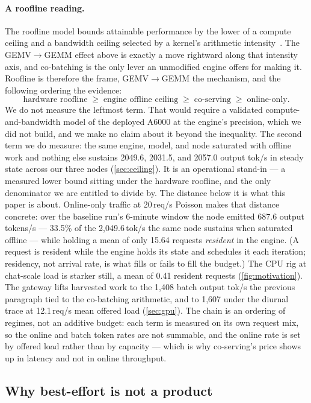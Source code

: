 \documentclass[11pt]{article}
\begin{document}
\paragraph{A roofline reading.} The roofline model bounds attainable performance by the
lower of a compute ceiling and a bandwidth ceiling selected by a kernel's arithmetic
intensity~\citep{roofline}. The GEMV$\to$GEMM effect above is exactly a move rightward
along that intensity axis, and co-batching is the only lever an unmodified engine offers
for making it. Roofline is therefore the frame, GEMV$\to$GEMM the mechanism, and the
following ordering the evidence:
\[
  \text{hardware roofline} \;\ge\; \text{engine offline ceiling}
  \;\ge\; \text{co-serving} \;\ge\; \text{online-only}.
\]
We do not measure the leftmost term. That would require a validated compute-and-bandwidth
model of the deployed A6000 at the engine's precision, which we did not build, and we make
no claim about it beyond the inequality. The second term we do measure: the same engine,
model, and node saturated with offline work and nothing else sustains 2049.6, 2031.5, and
2057.0 output tok/s in steady state across our three nodes (\cref{sec:ceiling}). It is an
operational stand-in --- a measured lower bound sitting under the hardware roofline, and
the only denominator we are entitled to divide by. The distance below it is what this
paper is about. Online-only traffic at 20\,req/s Poisson makes that distance concrete:
over the baseline run's 6-minute window the node emitted 687.6 output tokens/s ---
33.5\% of the 2{,}049.6\,tok/s the same node sustains when saturated offline --- while
holding a mean of only 15.64 requests \emph{resident} in the engine. (A request is
resident while the engine holds its state and schedules it each iteration; residency,
not arrival rate, is what fills or fails to fill the budget.) The CPU rig at chat-scale
load is starker still, a mean of 0.41 resident requests (\cref{fig:motivation}). The
gateway lifts harvested work to the 1{,}408 batch output tok/s the previous paragraph
tied to the co-batching arithmetic, and to 1{,}607 under the diurnal trace at
12.1\,req/s mean offered load (\cref{sec:gpu}). The chain is an ordering of regimes, not an additive
budget: each term is measured on its own request mix, so the online and batch token rates
are not summable, and the online rate is set by offered load rather than by capacity ---
which is why co-serving's price shows up in latency and not in online throughput.

\subsection{Why best-effort is not a product}
\label{sec:why-contract}
\end{document}
